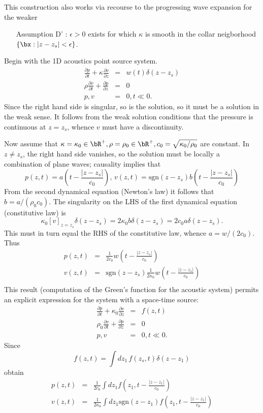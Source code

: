 This construction also works via recourse to the progressing wave
expansion for the weaker
\begin{itemize}
\item[Assumption D']: $\epsilon > 0$ exists for which $\kappa$ is
smooth in the collar neigborhood $\{\bx: |z-z_s|<\epsilon\}$.
\end{itemize}
  
Begin with the 1D acoustics point source system. 
\begin{eqnarray}
\label{eqn:awe1dptsrc}
\frac{\partial p}{\partial t} +\kappa\frac{\partial 
  v}{\partial z} &=& w(t)\delta(z-z_s) \nonumber\\
\rho \frac{\partial v}{\partial t} + \frac{\partial p}{\partial 
  z}&=&0\nonumber\\
 p,v&=&0, t \ll 0. 
\end{eqnarray}
Since the right hand side is singular, so is the solution, so it must
be a solution in the weak sense. It follows from the weak solution
conditions that the pressure is continuous at $z=z_s$, whence $v$ must
have a discontinuity. 

Now assume that $\kappa=\kappa_0 \in \bR^+, \rho=\rho_0 \in \bR^+, c_0
= \sqrt{\kappa_0/\rho_0}$ are constant. 
In $z \ne z_s$, the right hand side 
vanishes, so the solution must be locally a combination of plane
waves; causality implies that
\[
p(z,t)=a\left(t -\frac{|z-z_s|}{c_0}\right), \, v(z,t)=\mbox{sgn}(z-z_s) b\left(t -
  \frac{|z-z_s|}{c_0}\right)
\]
From the second dynamical equation (Newton's law) it follows that $b =
a/(\rho_0 c_0)$. The singularity on the LHS of the first dynamical
equation (constitutive law) is
\[
\kappa_0 [v]_{z=z_s}\delta(z-z_s) =
2\kappa_0 b\delta(z-z_s) = 2c_0 a\delta(z-z_s).
\] 
This must in turn equal the RHS of the constitutive law, whence
$a=w/(2c_0)$. Thus
\begin{eqnarray}
\label{eqn:sol1dptsrc}
p(z,t) &=& \frac{1}{2c_0}w\left(t - \frac{|z-z_s|}{c_0}\right) \nonumber \\
v(z,t) &=& \mbox{sgn}(z-z_s)\frac{1}{2\kappa_0}w\left(t -\frac{|z-z_s|}{c_0}\right)
           \nonumber \\
\end{eqnarray}
This result (computation of the Green's function for the acoustic
system) permits an explicit expression for the system with a
space-time source:
\begin{eqnarray}
\label{eqn:awe1d}
\frac{\partial p}{\partial t} +\kappa_0\frac{\partial 
  v}{\partial z} &=& f(z,t) \nonumber\\
\rho_0 \frac{\partial v}{\partial t} + \frac{\partial p}{\partial 
  z}&=&0\nonumber\\
 p,v&=&0, t \ll 0. 
\end{eqnarray}
Since
\[
  f(z,t) = \int dz_1\,f(z_s,t)\delta(z-z_1)
\]
obtain
\begin{eqnarray}
\label{eqn:sol1d}
p(z,t) &=& \frac{1}{2c_0}\int dz_1 f\left(z_1,t - \frac{|z-z_1|}{c_0}\right) \\
v(z,t) &=& \frac{1}{2\kappa_0} \int dz_1 \mbox{sgn} (z-z_1) f\left(z_1,t - \frac{|z-z_1|}{c_0}\right)\\
\end{eqnarray}

